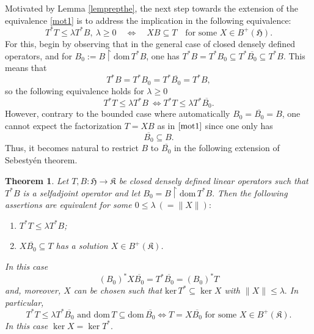 \documentclass{amsart}
\newtheorem{theorem}{Theorem}[section]
\newcommand{\n}{\|}
\newcommand{\ifaf}{\Leftrightarrow}
\newcommand{\h}{\mathfrak{H}}
\newcommand{\kk}{\mathfrak{K}}
\newcommand{\kerr}{\mathrm{ker}\,}
\newcommand{\D}{\mathrm{dom}\,}
\newcommand{\DT}{\mathrm{dom}\,T }
\newcommand{\adj}{^*}
\newcommand{\tstar}{T^{*}}
\newcommand{\inclu}{\subseteq}
\newcommand{\lplusk}{B^{+}(\kk)}
\newcommand{\lplus}{B^{+}(\h)}
\newcommand{\rest}{\upharpoonright}
\numberwithin{equation}{section}
\renewcommand{\labelenumi}{(\arabic{enumi})}
\begin{document}
Motivated by Lemma \ref{lemprepthe}, the next step towards the extension of    the equivalence  \eqref{mot1}   is to address  the implication in  the following equivalence:
     \begin{equation}\label{mot2}
        \tstar T \leq \lambda \tstar B, \ \lambda \geq 0 \quad  \ifaf \quad  XB \inclu T \quad \text{for some } X \in \lplus.
      \end{equation}
For this, begin by observing that      in the  general case of closed densely defined operators, and for $B_0:=B \rest \D \tstar B$, one has $\tstar B= \tstar B_0 \inclu \tstar \overline{B_0} \inclu \tstar B$. This means that
\begin{equation}\label{motivation}
\tstar B= \tstar B_0 = \tstar \overline{B_0} = \tstar B,
\end{equation}
so  the following equivalence holds for $\lambda \geq 0$
\begin{equation}\label{motivation2}
\tstar T \leq \lambda \tstar B \ \ifaf \tstar T \leq \lambda \tstar \overline{B_0}.
\end{equation}
However, contrary to the bounded case where automatically $B_0= \overline{B_0}=B$, one cannot expect the factorization $T=XB$ as in $\eqref{mot1}$  since one only has
\begin{equation*}
  \overline{B_0}   \inclu B.
\end{equation*}
Thus, it becomes natural to restrict $B$ to $\overline{B_0}$ in the following extension of Sebestyén theorem.
\begin{theorem} \label{firsttheo01}
  Let $T,B:\h \rightarrow \kk $ be closed densely defined linear operators such that $\tstar B $ is a selfadjoint operator and let $B_0= B\rest\D \tstar B.$ Then the following assertions are equivalent for some $0 \leq \lambda \ (  =\n X\n):$
   \begin{enumerate}\def\labelenumi{\rm(\roman{enumi})}
   \item   $T^* T  \leq \lambda \tstar B$;
     \item $X\overline{B_0} \inclu T$ has a solution $X \in \lplusk$.
      \end{enumerate}
      In this case
      \begin{equation}\label{work}
       (B_0)\adj X \overline{B_0} =  \tstar \overline{B_0}=(B_0)\adj T
      \end{equation}
      and, moreover,       $X$ can be chosen such  that $\kerr \tstar \inclu \ker X$ with $\n X \n \leq \lambda.$ In particular,
      \begin{equation}\label{secondseb}
        T^* T  \leq \lambda \tstar \overline{B_0} \text{ and }  \DT \inclu \D \overline{B_0} \ifaf T=X \overline{B_0} \text{ for some } X \in \lplusk.
      \end{equation}
      In this case   $\ker X = \ker \tstar.$
\end{theorem}
\end{document}
